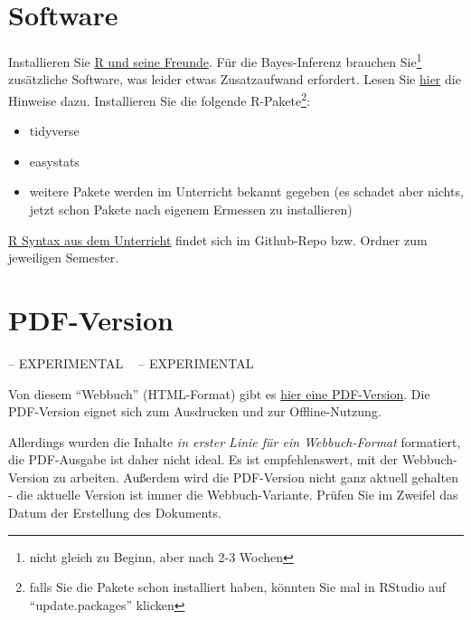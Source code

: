 \documentclass[
  a4paper,
  DIV=11]{scrreprt}
\providecommand{\tightlist}{%
  \setlength{\itemsep}{0pt}\setlength{\parskip}{0pt}}\usepackage{longtable,booktabs,array}
\theoremstyle{definition}
\theoremstyle{definition}
\theoremstyle{remark}
\begin{document}
\hypertarget{software}{%
\section*{Software}\label{software}}


Installieren Sie
\href{https://data-se.netlify.app/2021/11/30/installation-von-r-und-seiner-freunde/}{R
und seine Freunde}. Für die Bayes-Inferenz brauchen Sie\footnote{nicht
  gleich zu Beginn, aber nach 2-3 Wochen} zusätzliche Software, was
leider etwas Zusatzaufwand erfordert. Lesen Sie
\href{https://data-se.netlify.app/2022/01/28/bayes-software-installieren-f\%C3\%BCr-r/}{hier}
die Hinweise dazu. Installieren Sie die folgende R-Pakete\footnote{falls
  Sie die Pakete schon installiert haben, könnten Sie mal in RStudio auf
  ``update.packages'' klicken}:

\begin{itemize}
\tightlist
\item
  tidyverse
\item
  easystats
\item
  weitere Pakete werden im Unterricht bekannt gegeben (es schadet aber
  nichts, jetzt schon Pakete nach eigenem Ermessen zu installieren)
\end{itemize}

\href{https://github.com/sebastiansauer/Lehre}{R Syntax aus dem
Unterricht} findet sich im Github-Repo bzw. Ordner zum jeweiligen
Semester.

\hypertarget{pdf-version}{%
\section*{PDF-Version}\label{pdf-version}}


-- EXPERIMENTAL 🔬🧪 -- EXPERIMENTAL

Von diesem ``Webbuch'' (HTML-Format) gibt es \href{statistik1.pdf}{hier
eine PDF-Version}. Die PDF-Version eignet sich zum Ausdrucken und zur
Offline-Nutzung.

Allerdings wurden die Inhalte \emph{in erster Linie für ein
Webbuch-Format} formatiert, die PDF-Ausgabe ist daher nicht ideal. Es
ist empfehlenswert, mit der Webbuch-Version zu arbeiten. Außerdem wird
die PDF-Version nicht ganz aktuell gehalten - die aktuelle Version ist
immer die Webbuch-Variante. Prüfen Sie im Zweifel das Datum der
Erstellung des Dokuments.
\end{document}
